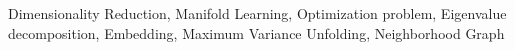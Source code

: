 \acresetall
\noindent Dimensionality Reduction, Manifold Learning, Optimization problem,  Eigenvalue decomposition, Embedding, Maximum Variance Unfolding, Neighborhood Graph